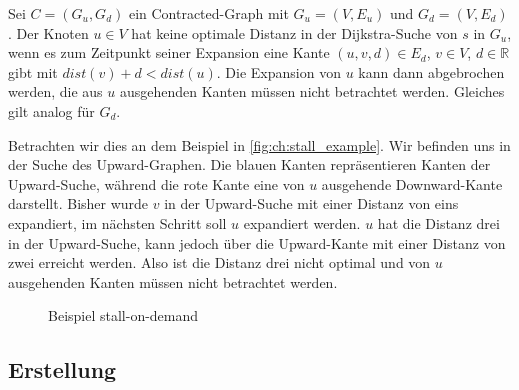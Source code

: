 \begin{definition}
  Sei $C = (G_u, G_d)$ ein Contracted-Graph mit $G_u = (V, E_u)$ und $G_d = (V, E_d)$.
  Der Knoten $u \in V$ hat keine optimale Distanz in der Dijkstra-Suche von $s$ in $G_u$, wenn es zum Zeitpunkt seiner Expansion eine Kante $(u, v, d) \in E_d$, $v \in V$, $d \in \mathbb{R}$ gibt mit ${dist}(v) + d < {dist}(u)$.
  Die Expansion von $u$ kann dann abgebrochen werden, die aus $u$ ausgehenden Kanten müssen nicht betrachtet werden.
  Gleiches gilt analog für $G_d$.
\end{definition}

Betrachten wir dies an dem Beispiel in \autoref{fig:ch:stall_example}.
Wir befinden uns in der Suche des Upward-Graphen.
Die blauen Kanten repräsentieren Kanten der Upward-Suche, während die rote Kante eine von $u$ ausgehende Downward-Kante darstellt.
Bisher wurde $v$ in der Upward-Suche mit einer Distanz von eins expandiert, im nächsten Schritt soll $u$ expandiert werden.
$u$ hat die Distanz drei in der Upward-Suche, kann jedoch über die Upward-Kante mit einer Distanz von zwei erreicht werden.
Also ist die Distanz drei nicht optimal und von $u$ ausgehenden Kanten müssen nicht betrachtet werden.

\begin{figure}
  \centering
  \caption{Beispiel stall-on-demand}
  \label{fig:ch:stall_example}
\end{figure}

\subsection{Erstellung}


